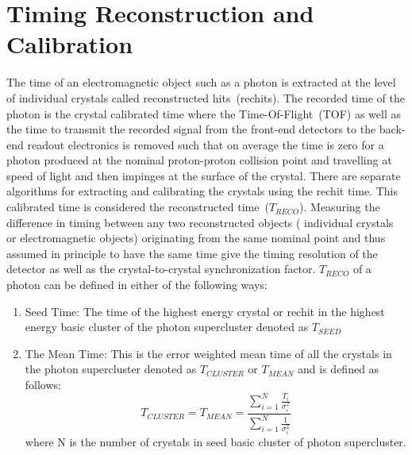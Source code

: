 \chapter{Timing Reconstruction and Calibration}
The time of an electromagnetic object such as a photon is extracted at the level of individual crystals called reconstructed hits~(rechits). The recorded time of the photon is the crystal calibrated time where the Time-Of-Flight~(TOF) as well as the time to transmit the recorded signal from the front-end detectors to the back-end readout electronics is removed such that on average the time is zero for a photon produced at the nominal proton-proton collision point and travelling at speed of light and then impinges at the surface of the crystal.  There are separate algorithms for extracting and calibrating the crystals using the rechit time. This calibrated time is considered the reconstructed time~($T_{RECO}$). 
Measuring the difference in timing between any two reconstructed objects ( individual crystals or electromagnetic objects) originating from the same nominal point and thus assumed in principle to have the same time give the timing resolution of the detector as well as the crystal-to-crystal synchronization factor.  $T_{RECO}$ of a photon can be defined in either of the following ways:
\begin{enumerate}
\item Seed Time: The time of the highest energy crystal or rechit in the highest energy basic cluster of the photon supercluster denoted as $T_{SEED}$
\item The Mean Time: This is the error weighted mean time of all the crystals in the photon supercluster denoted as $T_{CLUSTER}$ or $T_{MEAN}$ and is defined as follows:
\begin{equation}
T_{CLUSTER} = T_{MEAN} = \frac{\sum_{i=1}^N\frac{T_{i}}{\sigma_{i}^{2}}}{\sum_{i=1}^{N}\frac{1}{\sigma_{i}^{2}}} 
\end{equation}
\newline
 where N is the number of crystals in seed basic cluster of photon supercluster. 

\end{enumerate}
